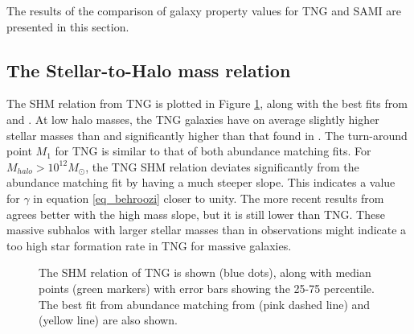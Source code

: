 The results of the comparison of galaxy property values for TNG and SAMI are presented in this section. 

\subsection{The Stellar-to-Halo mass relation}
The SHM relation from TNG is plotted in Figure \ref{shmr_res}, along with the best fits from \textcite{Behroozi2013} and \textcite{Zanisi2019}. At low halo masses, the TNG galaxies have on average slightly higher stellar masses than \textcite{Behroozi2013} and significantly higher than that found in \textcite{Zanisi2019}. The turn-around point $M_1$ for TNG is similar to that of both abundance matching fits. For $M_{halo} > 10^{12} M_{\odot}$, the TNG SHM relation deviates significantly from the abundance matching fit by having a much steeper slope. This indicates a value for $\gamma$ in equation \ref{eq_behroozi} closer to unity. The more recent results from \textcite{Zanisi2019} agrees better with the high mass slope, but it is still lower than TNG. These massive subhalos with larger stellar masses than in observations might indicate a too high star formation rate in TNG for massive galaxies.


\begin{figure}
    \centering
    \caption{The SHM relation of TNG is shown (blue dots), along with median points (green markers) with error bars showing the 25-75 percentile. The best fit from abundance matching from \textcite{Behroozi2013} (pink dashed line) and \textcite{Zanisi2019} (yellow line) are also shown.} 
    \label{shmr_res}
\end{figure}


